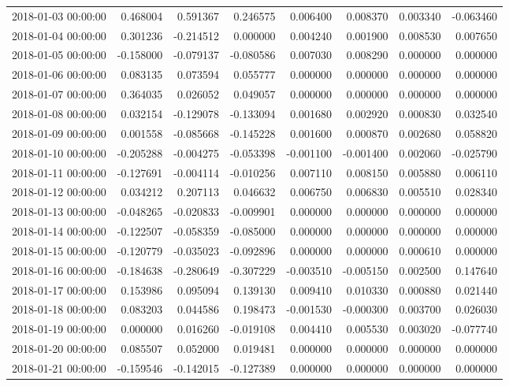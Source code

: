 \begin{tabular}{lrrrrrrr}
2018-01-03 00:00:00 & 0.468004 & 0.591367 & 0.246575 & 0.006400 & 0.008370 & 0.003340 & -0.063460 \\
2018-01-04 00:00:00 & 0.301236 & -0.214512 & 0.000000 & 0.004240 & 0.001900 & 0.008530 & 0.007650 \\
2018-01-05 00:00:00 & -0.158000 & -0.079137 & -0.080586 & 0.007030 & 0.008290 & 0.000000 & 0.000000 \\
2018-01-06 00:00:00 & 0.083135 & 0.073594 & 0.055777 & 0.000000 & 0.000000 & 0.000000 & 0.000000 \\
2018-01-07 00:00:00 & 0.364035 & 0.026052 & 0.049057 & 0.000000 & 0.000000 & 0.000000 & 0.000000 \\
2018-01-08 00:00:00 & 0.032154 & -0.129078 & -0.133094 & 0.001680 & 0.002920 & 0.000830 & 0.032540 \\
2018-01-09 00:00:00 & 0.001558 & -0.085668 & -0.145228 & 0.001600 & 0.000870 & 0.002680 & 0.058820 \\
2018-01-10 00:00:00 & -0.205288 & -0.004275 & -0.053398 & -0.001100 & -0.001400 & 0.002060 & -0.025790 \\
2018-01-11 00:00:00 & -0.127691 & -0.004114 & -0.010256 & 0.007110 & 0.008150 & 0.005880 & 0.006110 \\
2018-01-12 00:00:00 & 0.034212 & 0.207113 & 0.046632 & 0.006750 & 0.006830 & 0.005510 & 0.028340 \\
2018-01-13 00:00:00 & -0.048265 & -0.020833 & -0.009901 & 0.000000 & 0.000000 & 0.000000 & 0.000000 \\
2018-01-14 00:00:00 & -0.122507 & -0.058359 & -0.085000 & 0.000000 & 0.000000 & 0.000000 & 0.000000 \\
2018-01-15 00:00:00 & -0.120779 & -0.035023 & -0.092896 & 0.000000 & 0.000000 & 0.000610 & 0.000000 \\
2018-01-16 00:00:00 & -0.184638 & -0.280649 & -0.307229 & -0.003510 & -0.005150 & 0.002500 & 0.147640 \\
2018-01-17 00:00:00 & 0.153986 & 0.095094 & 0.139130 & 0.009410 & 0.010330 & 0.000880 & 0.021440 \\
2018-01-18 00:00:00 & 0.083203 & 0.044586 & 0.198473 & -0.001530 & -0.000300 & 0.003700 & 0.026030 \\
2018-01-19 00:00:00 & 0.000000 & 0.016260 & -0.019108 & 0.004410 & 0.005530 & 0.003020 & -0.077740 \\
2018-01-20 00:00:00 & 0.085507 & 0.052000 & 0.019481 & 0.000000 & 0.000000 & 0.000000 & 0.000000 \\
2018-01-21 00:00:00 & -0.159546 & -0.142015 & -0.127389 & 0.000000 & 0.000000 & 0.000000 & 0.000000 \\

\end{tabular}
